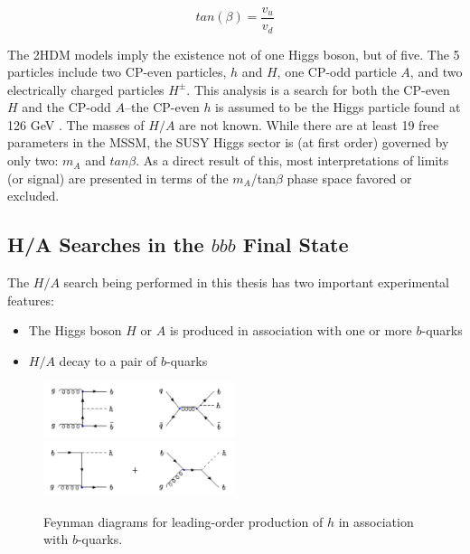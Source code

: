\begin{equation}
	tan(\beta) = \frac{v_u}{v_d}
\end{equation}




The 2HDM models imply the existence not of one Higgs boson, but of five.  The 5 particles include two CP-even particles, $h$ and $H$, one CP-odd particle $A$, and two electrically charged particles $H^\pm$.   This analysis is a search for both the CP-even $H$ and the CP-odd $A$--the CP-even $h$ is assumed to be the Higgs particle found at 126 GeV \cite{PDG-Review}.  The masses of $H/A$ are not known.  While there are at least 19 free parameters in the MSSM, the SUSY Higgs sector is (at first order) governed by only two: $m_A$ and $tan\beta$.  As a direct result of this, most interpretations of limits (or signal) are presented in terms of the $m_A$/tan$\beta$ phase space favored or excluded.  


\subsection{H/A Searches in the $bbb$ Final State}
The $H/A$ search being performed in this thesis has two important experimental features:

\begin{itemize}
    \item The Higgs boson $H$ or $A$ is produced in association with one or more $b$-quarks
    \item $H/A$ decay to a pair of $b$-quarks
\end{itemize}

\begin{figure}[H]
	\includegraphics[width=0.5\textwidth]{Theory/FeynmanDiagrams/bbH_FeynmanDiagrams.pdf}		
	\includegraphics[width=0.5\textwidth]{Theory/FeynmanDiagrams/bH_FeynmanDiagrams.pdf}
	\caption{Feynman diagrams for leading-order production of $h$ in association with $b$-quarks.  \label{fig:fd}}
\end{figure}

